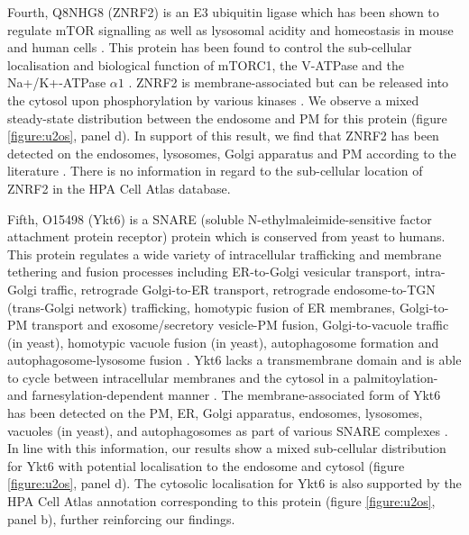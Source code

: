 \documentclass[12pt,english]{article}
\begin{document}
Fourth, Q8NHG8 (ZNRF2) is an E3 ubiquitin ligase which has been shown to regulate mTOR signalling as well as lysosomal acidity and homeostasis in mouse and human cells \citep{Hoxhaj:2016}. This protein has been found to control the sub-cellular localisation and biological function of mTORC1, the V-ATPase and the Na+/K+-ATPase $\alpha1$ \citep{Hoxhaj::2012, Hoxhaj:2016}. ZNRF2 is membrane-associated but can be released into the cytosol upon phosphorylation by various kinases \citep{Hoxhaj:2016}. We observe a mixed steady-state distribution between the endosome and PM for this protein (figure \ref{figure:u2os}, panel d). In support of this result, we find that ZNRF2 has been detected on the endosomes, lysosomes, Golgi apparatus and PM according to the literature \citep{Araki:2003, Hoxhaj:2016}. There is no information in regard to the sub-cellular location of ZNRF2 in the HPA Cell Atlas database. 

Fifth, O15498 (Ykt6) is a SNARE (soluble N-ethylmaleimide-sensitive factor attachment protein receptor) protein which is conserved from yeast to humans. This protein regulates a wide variety of intracellular trafficking and membrane tethering and fusion processes including ER-to-Golgi vesicular transport, intra-Golgi traffic, retrograde Golgi-to-ER transport, retrograde endosome-to-TGN (trans-Golgi network) trafficking, homotypic fusion of ER membranes, Golgi-to-PM transport and exosome/secretory vesicle-PM fusion, Golgi-to-vacuole traffic (in yeast), homotypic vacuole fusion (in yeast), autophagosome formation and autophagosome-lysosome fusion \citep{Dilcher::2001, Tai:2004, Takats::2018, Matsui::2018, Linnemannstons::2018, Yong::2019}. Ykt6 lacks a transmembrane domain and is able to cycle between intracellular membranes and the cytosol in a palmitoylation- and farnesylation-dependent manner \citep{Fukasawa::2004,Meiringer::2008}. The membrane-associated form of Ykt6 has been detected on the PM, ER, Golgi apparatus, endosomes, lysosomes, vacuoles (in yeast), and autophagosomes as part of various SNARE complexes \citep{Dilcher::2001, Tai:2004,Fukasawa::2004,Meiringer::2008, Takats::2018, Matsui::2018, Linnemannstons::2018, Yong::2019}. In line with this information, our results show a mixed sub-cellular distribution for Ykt6 with potential localisation to the endosome and cytosol (figure \ref{figure:u2os}, panel d). The cytosolic localisation for Ykt6 is also supported by the HPA Cell Atlas annotation corresponding to this protein (figure \ref{figure:u2os}, panel b), further reinforcing our findings.
\end{document}
